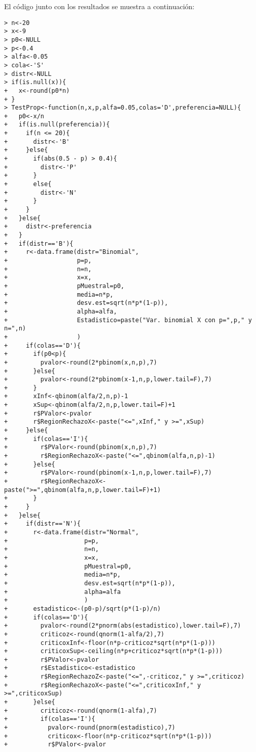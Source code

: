 \begin{solucion}
 El c\'odigo junto con los resultados se muestra a continuaci\'on:
 \begin{verbatim}
> n<-20
> x<-9
> p0<-NULL
> p<-0.4
> alfa<-0.05
> cola<-'S'
> distr<-NULL
> if(is.null(x)){
+   x<-round(p0*n)
+ }
> TestProp<-function(n,x,p,alfa=0.05,colas='D',preferencia=NULL){
+   p0<-x/n
+   if(is.null(preferencia)){
+     if(n <= 20){
+       distr<-'B'
+     }else{
+       if(abs(0.5 - p) > 0.4){
+         distr<-'P'
+       }
+       else{
+         distr<-'N'
+       }
+     }
+   }else{
+     distr<-preferencia
+   }
+   if(distr=='B'){
+     r<-data.frame(distr="Binomial",
+                   p=p,
+                   n=n,
+                   x=x,
+                   pMuestral=p0,
+                   media=n*p,
+                   desv.est=sqrt(n*p*(1-p)),
+                   alpha=alfa,
+                   Estadistico=paste("Var. binomial X con p=",p," y n=",n)
+                   )
+     if(colas=='D'){
+       if(p0<p){
+         pvalor<-round(2*pbinom(x,n,p),7)
+       }else{
+         pvalor<-round(2*pbinom(x-1,n,p,lower.tail=F),7)
+       }
+       xInf<-qbinom(alfa/2,n,p)-1
+       xSup<-qbinom(alfa/2,n,p,lower.tail=F)+1
+       r$PValor<-pvalor
+       r$RegionRechazoX<-paste("<=",xInf," y >=",xSup)
+     }else{
+       if(colas=='I'){
+         r$PValor<-round(pbinom(x,n,p),7)
+         r$RegionRechazoX<-paste("<=",qbinom(alfa,n,p)-1)
+       }else{
+         r$PValor<-round(pbinom(x-1,n,p,lower.tail=F),7)
+         r$RegionRechazoX<-paste(">=",qbinom(alfa,n,p,lower.tail=F)+1)
+       }
+     }
+   }else{
+     if(distr=='N'){
+       r<-data.frame(distr="Normal",
+                     p=p,
+                     n=n,
+                     x=x,
+                     pMuestral=p0,
+                     media=n*p,
+                     desv.est=sqrt(n*p*(1-p)),
+                     alpha=alfa
+                     )
+       estadistico<-(p0-p)/sqrt(p*(1-p)/n)
+       if(colas=='D'){
+         pvalor<-round(2*pnorm(abs(estadistico),lower.tail=F),7)
+         criticoz<-round(qnorm(1-alfa/2),7)
+         criticoxInf<-floor(n*p-criticoz*sqrt(n*p*(1-p)))
+         criticoxSup<-ceiling(n*p+criticoz*sqrt(n*p*(1-p)))
+         r$PValor<-pvalor
+         r$Estadistico<-estadistico
+         r$RegionRechazoZ<-paste("<=",-criticoz," y >=",criticoz)
+         r$RegionRechazoX<-paste("<=",criticoxInf," y >=",criticoxSup)
+       }else{
+         criticoz<-round(qnorm(1-alfa),7)
+         if(colas=='I'){
+           pvalor<-round(pnorm(estadistico),7)
+           criticox<-floor(n*p-criticoz*sqrt(n*p*(1-p)))
+           r$PValor<-pvalor

\end{verbatim}
\end{solucion}
